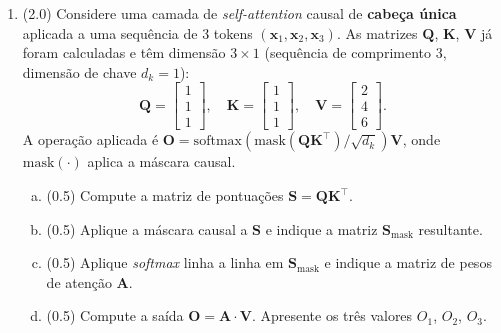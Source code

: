 \documentclass[11pt,a4paper]{article}
\begin{document}
\begin{enumerate}[1)]
\begin{enumerate}[a)]
    \item ( )\,V \quad ( )\,F \quad \textit{Multi-Query Attention} (MQA) usa $H$ cabeças independentes para Q, K e V; portanto, reduzir o número de cabeças \emph{de Q} é a forma de diminuir o tamanho do \textit{KV-cache} durante a inferência.\\[0.2em]
    \rule{\linewidth}{0.4pt}\\[0.2em]
    \rule{\linewidth}{0.4pt}
\end{enumerate}

\item (2.0) Considere uma camada de \textit{self-attention} causal de \textbf{cabeça única} aplicada a uma sequência de 3 tokens $(\mathbf{x}_1, \mathbf{x}_2, \mathbf{x}_3)$. As matrizes $\mathbf{Q}$, $\mathbf{K}$, $\mathbf{V}$ já foram calculadas e têm dimensão $3 \times 1$ (sequência de comprimento 3, dimensão de chave $d_k = 1$):
\[
    \mathbf{Q} = \begin{bmatrix} 1 \\ 1 \\ 1 \end{bmatrix},\quad
    \mathbf{K} = \begin{bmatrix} 1 \\ 1 \\ 1 \end{bmatrix},\quad
    \mathbf{V} = \begin{bmatrix} 2 \\ 4 \\ 6 \end{bmatrix}.
\]
A operação aplicada é $\mathbf{O} = \mathrm{softmax}\!\left(\mathrm{mask}(\mathbf{Q}\mathbf{K}^\top)/\sqrt{d_k}\right) \mathbf{V}$, onde $\mathrm{mask}(\cdot)$ aplica a máscara causal.

\begin{enumerate}[a)]
    \item (0.5) Compute a matriz de pontuações $\mathbf{S} = \mathbf{Q}\mathbf{K}^\top$.
    \vspace{1.5cm}

    \item (0.5) Aplique a máscara causal a $\mathbf{S}$ e indique a matriz $\mathbf{S}_\text{mask}$ resultante.
    \vspace{1.5cm}

    \item (0.5) Aplique \textit{softmax} linha a linha em $\mathbf{S}_\text{mask}$ e indique a matriz de pesos de atenção $\mathbf{A}$.
    \vspace{2.5cm}

    \item (0.5) Compute a saída $\mathbf{O} = \mathbf{A} \cdot \mathbf{V}$. Apresente os três valores $O_1$, $O_2$, $O_3$.
    \vspace{2cm}
\end{enumerate}

\end{enumerate}
\end{document}
